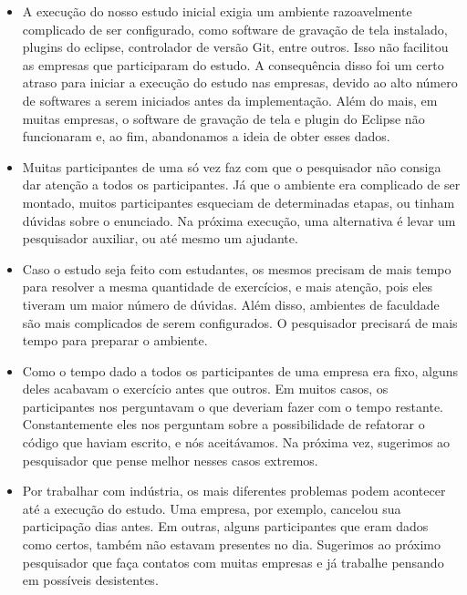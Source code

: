 \begin{itemize}
	
	\item A execução do nosso estudo inicial exigia um ambiente razoavelmente
	complicado de ser configurado, como software de gravação de tela instalado, plugins do eclipse,
	controlador de versão Git, entre outros. Isso não facilitou as empresas que participaram
	do estudo. A consequência disso foi um certo atraso para iniciar a execução do estudo nas empresas, 
	devido ao alto número de softwares a serem iniciados antes da implementação. Além do mais, em muitas empresas,
	o software de gravação de tela e plugin do Eclipse não funcionaram e, ao fim, abandonamos a ideia de
	obter esses dados.
	
	\item Muitas participantes de uma só vez faz com que o pesquisador não consiga dar atenção
	a todos os participantes. Já que o ambiente era complicado de ser montado, muitos participantes
	esqueciam de determinadas etapas, ou tinham dúvidas sobre o enunciado. Na próxima execução,
	uma alternativa é levar um pesquisador auxiliar, ou até mesmo um ajudante.
	
	\item Caso o estudo seja feito com estudantes, os mesmos precisam de mais tempo para resolver
	a mesma quantidade de exercícios, e mais atenção, pois eles tiveram um maior número
	de dúvidas. Além disso, ambientes de faculdade são mais complicados de serem configurados.
	O pesquisador precisará de mais tempo para preparar o ambiente.
	
	\item Como o tempo dado a todos os participantes de uma empresa era fixo, alguns deles
	acabavam o exercício antes que outros. Em muitos casos, os participantes nos perguntavam
	o que deveriam fazer com o tempo restante. Constantemente eles nos perguntam sobre a possibilidade
	de refatorar o código que haviam escrito, e nós aceitávamos. Na próxima vez, sugerimos
	ao pesquisador que pense melhor nesses casos extremos.
	
	\item Por trabalhar com indústria, os mais diferentes problemas podem acontecer 
	até a execução do estudo. Uma empresa, por exemplo, cancelou sua participação
	dias antes. Em outras, alguns participantes que eram dados como certos, também
	não estavam presentes no dia. Sugerimos ao próximo pesquisador que faça contatos
	com muitas empresas e já trabalhe pensando em possíveis desistentes.
	

\end{itemize}
